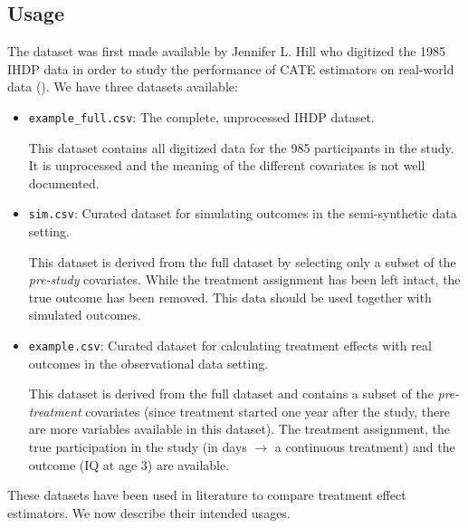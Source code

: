 \documentclass[10pt,letterpaper]{article}
\begin{document}
\subsection{Usage}
	
	The dataset was first made available by Jennifer L. Hill who digitized the 1985 IHDP data in order to study the performance of CATE estimators on real-world data (\cite{hill2011bayesian}). We have three datasets available:
	\begin{itemize}
		\item \texttt{example\_full.csv}: The complete, unprocessed IHDP dataset. 
		
		This dataset contains all digitized data for the 985 participants in the study. It is unprocessed and the meaning of the different covariates is not well documented. 
		
		\item \texttt{sim.csv}: Curated dataset for simulating outcomes in the semi-synthetic data setting.
		
		This dataset is derived from the full dataset by selecting only a subset of the \textit{pre-study} covariates. While the treatment assignment has been left intact, the true outcome has been removed. This data should be used together with simulated outcomes. 

		\item \texttt{example.csv}: Curated dataset for calculating treatment effects with real outcomes in the observational data setting.
		
		This dataset is derived from the full dataset and contains a subset of the \textit{pre-treatment} covariates (since treatment started one year after the study, there are more variables available in this dataset). The treatment assignment, the true participation in the study (in days $\rightarrow$ a continuous treatment) and the outcome (IQ at age 3) are available.
	\end{itemize}
	These datasets have been used in literature to compare treatment effect estimators. We now describe their intended usages.
\end{document}
